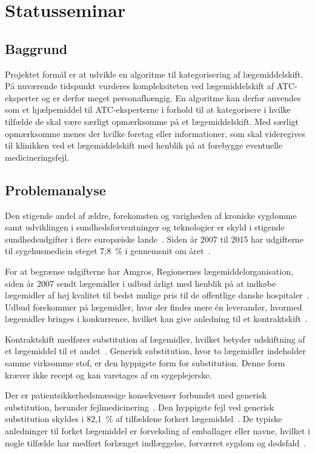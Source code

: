 \chapter{Statusseminar}
\section{Baggrund}
Projektet formål er at udvikle en algoritme til kategorisering af lægemiddelskift. På nuværende tidspunkt vurderes kompleksiteten ved lægemiddelskift af ATC-eksperter og er derfor meget personafhængig. En algoritme kan derfor anvendes som et hjælpemiddel til ATC-eksperterne i forhold til at kategorisere i hvilke tilfælde de skal være særligt opmærksomme på et lægemiddelskift. Med særligt opmærksomme menes der hvilke foretag eller informationer, som skal videregives til klinikken ved et lægemiddelskift med henblik på at forebygge eventuelle medicineringsfejl. 

\section{Problemanalyse}
Den stigende andel af ældre, forekomsten og varigheden af kroniske sygdomme samt udviklingen i sundhedsforventninger og teknologier er skyld i stigende sundhedsudgifter i flere europæiske lande~\citep{Ess2003}. Siden år 2007 til 2015 har udgifterne til sygehusmedicin steget 7,8~\% i gennemsnit om året~\citep{Sundhed2016}.

For at begrænse udgifterne har Amgros, Regionernes lægemiddelorganisation, siden år 2007 sendt lægemidler i udbud årligt med henblik på at indkøbe lægemidler af høj kvalitet til bedst mulige pris til de offentlige danske hospitaler~\citep{Sygehusapoteket2017}. Udbud forekommer på lægemidler, hvor der findes mere én leverandør, hvormed lægemidler bringes i konkurrence, hvilket kan give anledning til et kontraktskift~\citep{Amgros2015}. 

Kontraktskift medfører substitution af lægemidler, hvilket betyder udskiftning af et lægemiddel til et andet~\citep{DanskSelskabforPatientsikkerhed2009}. 
Generisk substitution, hvor to lægemidler indeholder samme virksomme stof, er den hyppigste form for substitution. Denne form kræver ikke recept og kan varetages af en sygeplejerske.~\citep{DanskSelskabforPatientsikkerhed2009} 

Der er patientsikkerhedsmæssige konsekvenser forbundet med generisk substitution, herunder fejlmedicinering~\citep{Hakonsen2010}. 
Den hyppigste fejl ved generisk substitution skyldes i 82,1~\% af tilfældene forkert lægemiddel~\citep{Hakonsen2010}. De typiske anledninger til forket lægemiddel er forveksling af emballager eller navne, hvilket i nogle tilfælde har medført forlænget indlæggelse, forværret sygdom og dødsfald~\citep{DanskSelskabforPatientsikkerhed2009}.

